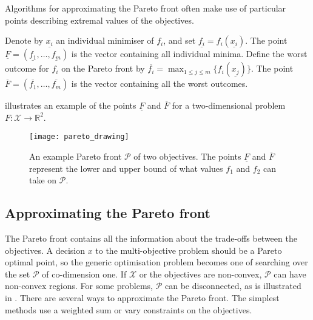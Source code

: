 \documentclass[main.tex]{subfiles}
\begin{document}
Algorithms for approximating the Pareto front
often make use of particular points describing extremal
values of the objectives.
\begin{mydef}
  Denote by $\underline{x_i}$ an individual minimiser of $f_i$, and
  set $\underline{f_i}=f_i(\underline {x_i})$.
  The point $\underline{F}=(\underline{f_1},\dots,\underline{f_m})$
  is the vector containing all individual minima.
  Define the worst outcome for $f_i$ on the Pareto front by
  $\overline{f_i}=\max_{1\leq j\leq m}\{f_i(\underline{x_j})\}$.
  The point  $\overline{F} =
  (\overline{f_1}, \dots, \overline{f_m})$ is the vector containing
  all the worst outcomes.
\end{mydef}

\begin{example}
   illustrates an example of the points
  $\underline{F}$ and $\overline{F}$ %
  for a two-dimensional problem $F:\mathcal{X}\to\mathbb{R}^2$.
  \begin{figure}[htbp]
    \centering
    \texttt{[image: pareto\_drawing]}
    \caption[An example Pareto front for two objectives]{An example Pareto front $\mathcal{P}$ of two
      objectives. The points $\underline{F}$ and $\overline{F}$
      represent the
      lower and upper bound of what values
      $f_1$ and $f_2$ can take on $\mathcal{P}$.}\label{fig:pareto_drawing}
  \end{figure}
\end{example}

\subsection{Approximating the Pareto front}\label{sec:multi_pareto_front}
The Pareto front contains all the information about the trade-offs between the
objectives. A decision $x$ to the multi-objective problem
should be a Pareto optimal point, so the generic
optimisation problem becomes one of searching over the set
$\mathcal{P}$ of co-dimension one. If $\mathcal{X}$ or the objectives are non-convex,
$\mathcal{P}$ can have non-convex regions. For some problems,
$\mathcal{P}$ can be disconnected, as is illustrated in
.
There are several ways to approximate the Pareto front. The simplest
methods use a weighted sum or vary constraints on the objectives.
\end{document}
